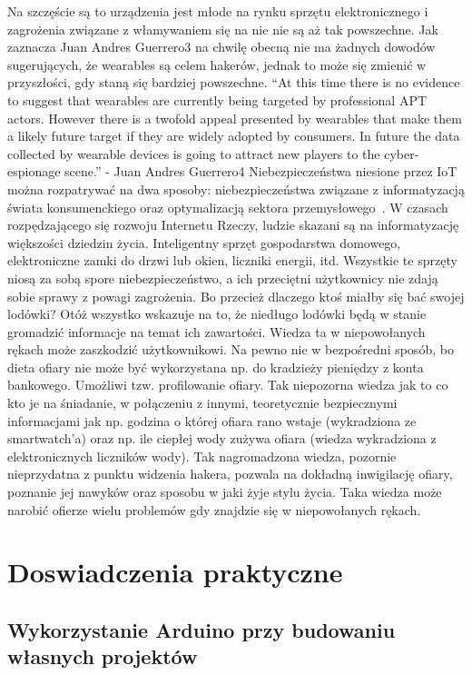 \documentclass[brudnopis]{xmgr}
\begin{document}
Na szczęście są to urządzenia jest młode na rynku sprzętu elektronicznego i zagrożenia związane z włamywaniem się na nie nie są aż tak powszechne. Jak zaznacza Juan Andres Guerrero3 na chwilę obecną nie ma żadnych dowodów sugerujących, że wearables są celem hakerów, jednak to może się zmienić w przyszłości, gdy staną się bardziej powszechne.
“At this time there is no evidence to suggest that wearables are currently being targeted by professional APT actors. However there is a twofold appeal presented by wearables that make them a likely future target if they are widely adopted by consumers.  In future the data collected by wearable devices is going to attract new players to the cyber-espionage scene.” -  Juan Andres Guerrero4
Niebezpieczeństwa niesione przez IoT można rozpatrywać na dwa sposoby: niebezpieczeństwa związane z informatyzacją świata konsumenckiego oraz optymalizacją sektora przemysłowego~\cite{Ks:2014:CMC}. W czasach rozpędzającego się rozwoju Internetu Rzeczy, ludzie skazani są na informatyzację większości dziedzin życia. Inteligentny sprzęt gospodarstwa domowego, elektroniczne zamki do drzwi lub okien, liczniki energii, itd. Wszystkie te sprzęty niosą za sobą spore niebezpieczeństwo, a ich przeciętni użytkownicy nie zdają sobie sprawy z powagi zagrożenia. Bo przecież dlaczego ktoś miałby się bać swojej lodówki? Otóż wszystko wskazuje na to, że niedługo lodówki będą w stanie gromadzić informacje na temat ich zawartości. Wiedza ta w niepowołanych rękach może zaszkodzić użytkownikowi. Na pewno nie w bezpośredni sposób, bo dieta ofiary nie może być wykorzystana np. do kradzieży pieniędzy z konta bankowego. Umożliwi tzw. profilowanie ofiary. Tak niepozorna wiedza jak to co kto je na śniadanie, w połączeniu z innymi, teoretycznie bezpiecznymi informacjami jak np. godzina o której ofiara rano wstaje (wykradziona ze smartwatch'a) oraz np. ile ciepłej wody zużywa ofiara (wiedza wykradziona z elektronicznych liczników wody). Tak nagromadzona wiedza, pozornie nieprzydatna z punktu widzenia hakera, pozwala na dokładną inwigilację ofiary, poznanie jej nawyków oraz sposobu w jaki żyje stylu życia. Taka wiedza może narobić ofierze wielu problemów gdy znajdzie się w niepowołanych rękach.

\chapter{Doswiadczenia praktyczne}

\section{Wykorzystanie Arduino przy budowaniu własnych projektów}
\end{document}

